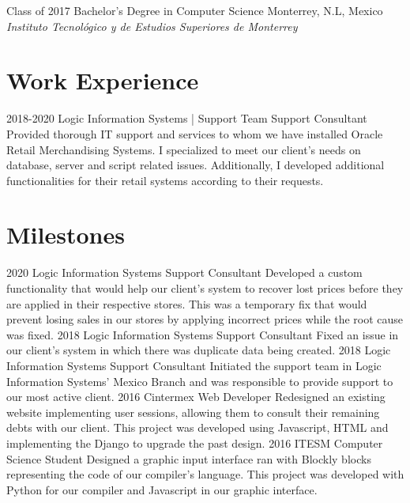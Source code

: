 \documentclass[]{twentysecondcv}
\begin{document}
\begin{twenty}
  \twentyitem
    {Class of 2017}
    {Bachelor's Degree {\normalfont in Computer Science}}
    {Monterrey, N.L, Mexico}
    {\emph{Instituto Tecnológico y de Estudios Superiores de Monterrey}}
\end{twenty}


\section{Work Experience}

\begin{twenty}
  \twentyitem
    {2018-2020}
    {Logic Information Systems | Support Team}
    {Support Consultant}
    {Provided thorough IT support and services to whom we have installed Oracle Retail Merchandising Systems. I specialized to meet our client's needs on database, server and script related issues. Additionally, I developed additional functionalities for their retail systems according to their requests.}
\end{twenty}



\section{Milestones}

\begin{twenty}
  \twentyitem
    {2020}
    {Logic Information Systems}
    {Support Consultant}
    {Developed a custom functionality that would help our client’s system to recover lost prices before they are applied in their respective stores. This was a temporary fix that would prevent losing sales in our stores by applying incorrect prices while the root cause was fixed.}
  \twentyitem
    {2018}
    {Logic Information Systems}
    {Support Consultant}
    {Fixed an issue in our client’s system in which there was duplicate data being created.}
  \twentyitem
    {2018}
    {Logic Information Systems}
    {Support Consultant}
    {Initiated the support team in Logic Information Systems’ Mexico Branch and was responsible to provide support to our most active client.}
\twentyitem
    {2016}
    {Cintermex}
    {Web Developer}
    {Redesigned an existing website implementing user sessions, allowing them to consult their remaining debts with our client. This project was developed using Javascript, HTML and implementing the Django to upgrade the past design.}
\twentyitem
    {2016}
    {ITESM}
    {Computer Science Student}
    {Designed a graphic input interface ran with Blockly blocks representing the code of our compiler's language. This project was developed with Python for our compiler and Javascript in our graphic interface.}
\end{twenty}
\end{document}
